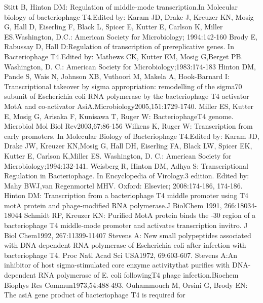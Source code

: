 \documentclass[14pt]{extarticle}
\begin{document}
\newpage
\begin{thebibliography}{9}
     Stitt B, Hinton DM: Regulation of middle-mode transcription.In Molecular biology  of  
    bacteriophage  T4.Edited by: Karam JD, Drake J, Kreuzer KN, Mosig G, Hall D, Eiserling F, Black L, Spicer E, Kutter 
    E, Carlson K, Miller ES.Washington, D.C.: American Society for Microbiology; 1994:142-160
     Brody E, Rabussay D, Hall D:Regulation of transcription of prereplicative genes. In Bacteriophage 
    T4.Edited by: Mathews CK, Kutter EM, Mosig G,Berget PB. Washington, D. C.: American Society for 
    Microbiology;1983:174-183
     Hinton DM, Pande S, Wais N, Johnson XB, Vuthoori M, Makela A, Hook-Barnard I: Transcriptional 
    takeover by sigma appropriation: remodelling of the sigma70 subunit of Escherichia coli RNA polymerase by the 
    bacteriophage T4 activator MotA and co-activator AsiA.Microbiology2005,151:1729-1740.
     Miller ES, Kutter E, Mosig G, Arisaka F, Kunisawa T, Ruger W: BacteriophageT4 genome. Microbiol  
    Mol  Biol  Rev2003,67:86-156
     Wilkens K, Ruger W: Transcription from early promoters. In Molecular Biology  of  Bacteriophage  
    T4.Edited by: Karam JD, Drake JW, Kreuzer KN,Mosig G, Hall DH, Eiserling FA, Black LW, Spicer EK, Kutter E, Carlson 
    K,Miller ES. Washington, D. C.: American Society for Microbiology;1994:132-141.
     Weisberg R, Hinton DM, Adhya S: Transcriptional Regulation in Bacteriophage. In Encyclopedia  of  
    Virology.3 edition. Edited by: Mahy BWJ,van Regenmortel MHV. Oxford: Elsevier; 2008:174-186, 174-186.
     Hinton DM: Transcription from a bacteriophage T4 middle promoter using T4 motA protein and 
    phage-modified RNA polymerase.J  BiolChem 1991, 266:18034-18044
     Schmidt RP, Kreuzer KN: Purified MotA protein binds the -30 region of a bacteriophage T4 
    middle-mode promoter and activates transcription invitro. J  Biol  Chem1992, 267:11399-11407
     Stevens A: New small polypeptides associated with DNA-dependent RNA polymerase of Escherichia coli
    after infection with bacteriophage T4. Proc  Natl  Acad  Sci  USA1972, 69:603-607.
     Stevens A:An inhibitor of host sigma-stimulated core enzyme activitythat purifies with 
    DNA-dependent RNA polymerase of E. coli followingT4 phage infection.Biochem  Biophys  Res  Commun1973,54:488-493.
     Ouhammouch M, Orsini G, Brody EN: The asiA gene product of bacteriophage T4 is required for 

\end{thebibliography}
\end{document}

